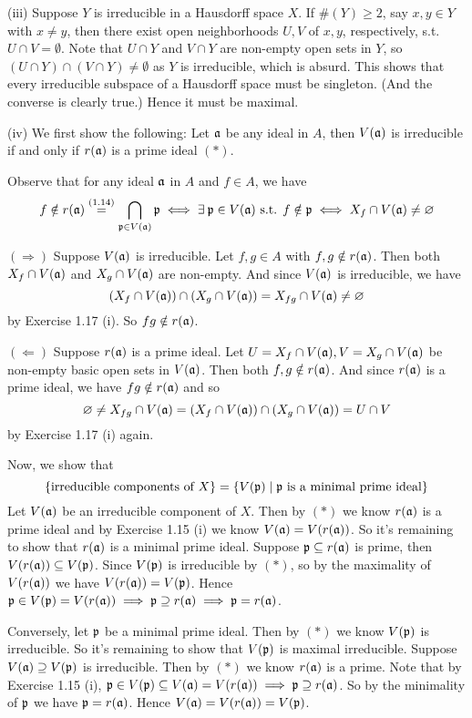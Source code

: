 \documentclass[../A&M.tex]{subfiles}
\begin{document}
(iii) Suppose $Y$ is irreducible in a Hausdorff space $X$. If $\#(Y) \geq 2$, say $x,y\in Y$ with $x\neq y$, then there exist open neighborhoods $U,V$ of $x,y$, respectively, s.t. $U \cap V = \emptyset$. Note that $U \cap Y$ and $V \cap Y$ are non-empty open sets in $Y$, so $(U \cap Y) \cap (V \cap Y) \neq \emptyset$ as $Y$ is irreducible, which is absurd. This shows that every irreducible subspace of a Hausdorff space must be singleton. (And the converse is clearly true.) Hence it must be maximal.

(iv) We first show the following: Let $\mathfrak{a}$ be any ideal in $A$, then $V(\mathfrak{a})$ is irreducible if and only if $r(\mathfrak{a})$ is a prime ideal $(*)$.

Observe that for any ideal $\mathfrak{a}$ in $A$ and $f\in A$, we have
$$
f \notin r(\afk) \overset{(1.14)}{=} \bigcap_{\pfk \in V(\afk)} \pfk
\iff \exists \pfk \in V(\afk) \text{ s.t. } f \notin \pfk
\iff X_f \cap V(\afk) \neq \emptyset
$$

$(\Rightarrow)$ Suppose $V(\mathfrak{a})$ is irreducible. Let $f,g \in A$ with $f,g \notin r(\mathfrak{a})$. Then both $X_f \cap V(\mathfrak{a})$ and $X_g \cap V(\mathfrak{a})$ are non-empty. And since $V(\mathfrak{a})$ is irreducible, we have
$$
(X_f \cap V(\mathfrak{a})) \cap (X_g \cap V(\mathfrak{a}))
= X_{fg} \cap V(\mathfrak{a})
\neq \varnothing
$$
by Exercise 1.17 (i). So $fg \notin r(\mathfrak{a})$.

$(\Leftarrow)$ Suppose $r(\mathfrak{a})$ is a prime ideal. Let $U = X_f \cap V(\mathfrak{a}), V = X_g \cap V(\mathfrak{a})$ be non-empty basic open sets in $V(\mathfrak{a})$. Then both $f,g \notin r(\mathfrak{a})$. And since $r(\mathfrak{a})$ is a prime ideal, we have $fg \notin r(\mathfrak{a})$ and so
$$
\varnothing \neq X_{fg} \cap V(\mathfrak{a})
= (X_f \cap V(\mathfrak{a})) \cap (X_g \cap V(\mathfrak{a}))
= U \cap V
$$
by Exercise 1.17 (i) again.

Now, we show that
$$
\{\text{irreducible components of } X \} = \{ V(\mathfrak{p}) \mid \mathfrak{p} \text{ is a minimal prime ideal}\}
$$
Let $V(\mathfrak{a})$ be an irreducible component of $X$. Then by $(*)$ we know $r(\mathfrak{a})$ is a prime ideal and by Exercise 1.15 (i) we know $V(\mathfrak{a}) = V(r(\mathfrak{a}))$. So it's remaining to show that $r(\mathfrak{a})$ is a minimal prime ideal. Suppose $\mathfrak{p} \subseteq r(\mathfrak{a})$ is prime, then $V(r(\mathfrak{a})) \subseteq V(\mathfrak{p})$. Since $V(\mathfrak{p})$ is irreducible by $(*)$, so by the maximality of $V(r(\mathfrak{a}))$ we have $V(r(\mathfrak{a})) = V(\mathfrak{p})$. Hence $\mathfrak{p} \in V(\mathfrak{p}) = V(r(\mathfrak{a})) \implies \mathfrak{p} \supseteq r(\mathfrak{a}) \implies \mathfrak{p} = r(\mathfrak{a})$.

Conversely, let $\mathfrak{p}$ be a minimal prime ideal. Then by $(*)$ we know $V(\mathfrak{p})$ is irreducible. So it's remaining to show that $V(\mathfrak{p})$ is maximal irreducible. Suppose $V(\mathfrak{a}) \supseteq V(\mathfrak{p})$ is irreducible. Then by $(*)$ we know $r(\mathfrak{a})$ is a prime. Note that by Exercise 1.15 (i), $\mathfrak{p} \in V(\mathfrak{p}) \subseteq V(\mathfrak{a}) = V(r(\mathfrak{a})) \implies \mathfrak{p} \supseteq r(\mathfrak{a})$. So by the minimality of $\mathfrak{p}$ we have $\mathfrak{p} = r(\mathfrak{a})$. Hence $V(\mathfrak{a}) = V(r(\mathfrak{a})) = V(\mathfrak{p})$.
\end{document}
